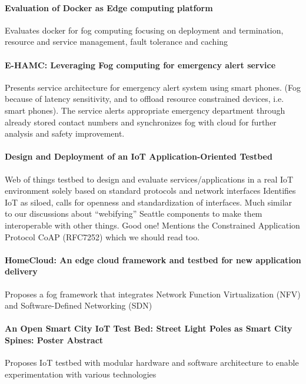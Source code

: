 \paragraph{Evaluation of Docker as Edge computing platform}\cite{ismail_evaluation_2015}
Evaluates docker for fog computing focusing on deployment and termination, resource and service management, fault tolerance and caching

\paragraph{E-HAMC: Leveraging Fog computing for emergency alert service} \cite{7134091}
Presents service architecture for emergency alert system using smart phones. (Fog because of latency sensitivity, and to offload resource constrained devices, i.e. smart phones). The service alerts appropriate emergency department through already stored contact numbers and synchronizes fog with cloud for further analysis and safety improvement.

\paragraph{Design and Deployment of an IoT Application-Oriented Testbed}\cite{belli_design_2015}
Web of things testbed to design and evaluate services/applications in a real IoT environment solely based on standard protocols and network interfaces
Identifies IoT as siloed, calls for openness and standardization of interfaces. Much similar to our discussions about ``webifying'' Seattle components to make them interoperable with other things. Good one! Mentions the Constrained Application Protocol CoAP (RFC7252) which we should read too.

\paragraph{HomeCloud: An edge cloud framework and testbed for new application delivery} \cite{pan_homecloud:_2016}
Proposes a fog framework that integrates Network Function Virtualization (NFV) and Software-Defined Networking (SDN)

\paragraph{An Open Smart City IoT Test Bed: Street Light Poles as Smart City Spines: Poster Abstract}\cite{amrutur_open_2017}
Proposes IoT testbed with modular hardware and software architecture to enable experimentation with various technologies

